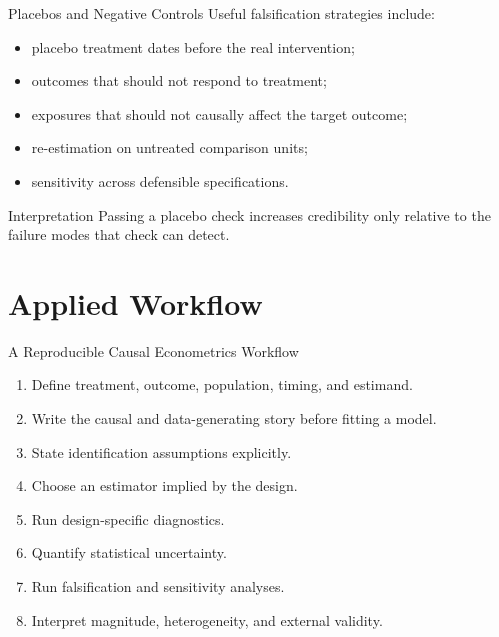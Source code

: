 \documentclass[aspectratio=169,11pt]{beamer}
\begin{document}
\begin{frame}{Placebos and Negative Controls}
Useful falsification strategies include:
\begin{itemize}
\item placebo treatment dates before the real intervention;
\item outcomes that should not respond to treatment;
\item exposures that should not causally affect the target outcome;
\item re-estimation on untreated comparison units;
\item sensitivity across defensible specifications.
\end{itemize}

\begin{alertblock}{Interpretation}
Passing a placebo check increases credibility only relative to the failure modes that check can detect.
\end{alertblock}
\end{frame}

\section{Applied Workflow}

\begin{frame}{A Reproducible Causal Econometrics Workflow}
\begin{enumerate}
\item Define treatment, outcome, population, timing, and estimand.
\item Write the causal and data-generating story before fitting a model.
\item State identification assumptions explicitly.
\item Choose an estimator implied by the design.
\item Run design-specific diagnostics.
\item Quantify statistical uncertainty.
\item Run falsification and sensitivity analyses.
\item Interpret magnitude, heterogeneity, and external validity.
\end{enumerate}
\end{frame}
\end{document}
